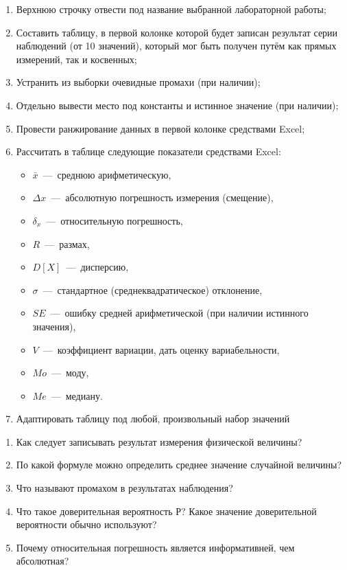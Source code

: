 \documentclass[14pt,a4paper]{article}
\begin{document}
\progress{}
\begin{enumerate}
    \item Верхнюю строчку отвести под название выбранной лабораторной работы;
    \item Составить таблицу, в первой колонке которой будет записан результат серии наблюдений (от 10 значений), который мог быть получен путём как прямых измерений, так и косвенных;
    \item Устранить из выборки очевидные промахи (при наличии);
    \item Отдельно вывести место под константы и истинное значение (при наличии);
    \item Провести ранжирование данных в первой колонке средствами Excel;
    \item Рассчитать в таблице следующие показатели средствами Excel: \\
    \begin{itemize}
        \item $\bar{x}$~---~среднюю арифметическую,
        \item $\Delta x$~---~абсолютную погрешность измерения (смещение),
        \item $\delta_x$~---~относительную погрешность,
        \item $R$~---~размах,
        \item $D[X]$~---~дисперсию, 
        \item $\sigma$~---~стандартное (среднеквадратическое) отклонение, 
        \item $SE$~---~ошибку средней арифметической (при наличии истинного значения), 
        \item $V$~---~коэффициент вариации, дать оценку вариабельности, 
        \item $Mo$~---~моду,
        \item $Me$~---~медиану.
    \end{itemize}
    \item Адаптировать таблицу под любой, произвольный набор значений
\end{enumerate}
\questions{}
\begin{enumerate}
    \item Как следует записывать результат измерения физической величины?
    \item По какой формуле можно определить среднее значение случайной величины?
    \item Что называют промахом в результатах наблюдения? 
    \item Что такое доверительная вероятность Р? Какое значение доверительной вероятности обычно используют? %
    \item Почему относительная погрешность является информативней, чем абсолютная?
\end{enumerate} 

\end{document}
